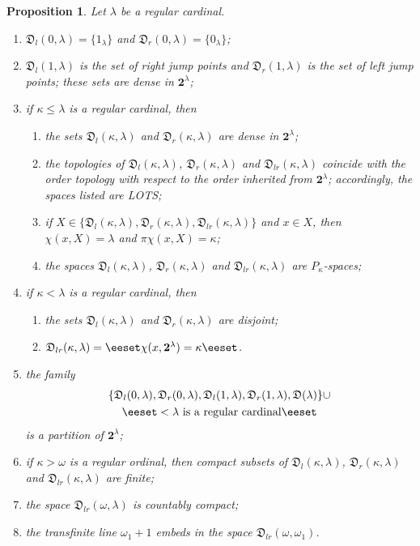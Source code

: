 \documentclass[preprint]{elsarticle}
\def\om{\omega}
\def\la{\lambda}
\def\ka{\kappa}
\def\sset#1{\{#1\}}
\def\set#1{\bbset#1\eeset}
\def\bbset#1:#2\eeset{\{#1\,:\,#2\}}
\newtheorem{proposition}{Proposition}[section]
\theoremstyle{definition}
\theoremstyle{remark}
\def\lex#1#2{\mathfrak{L}(#2^{#1})}
\def\lex#1#2{#2^{#1}}
\def\homg#1,#2#3{\mathfrak{D}_{#1}(#2,#3)}
\def\homm#1{{\mathfrak{D}(#1)}}
\def\B{2}
\def\B{\mathsf{2}}
\def\B{\mathbf{2}}
\def\lexab{\lex\la\B}
\begin{document}
\begin{proposition}\label{p:blex:1+1}
Let $\la$ be a regular cardinal.
\begin{enumerate}
\item
$\homg l,0\la=\sset{1_\la}$ and $\homg r,0\la=\sset{0_\la}$;
\item
$\homg l,1\la$ is the set of right jump points and $\homg r,1\la$ is the set of left jump points; these sets are dense in $\lexab$;
\item
if $\ka\leq \la$ is a regular cardinal, then 
\begin{enumerate}
\item
the sets $\homg l,\ka\la$ and $\homg r,\ka\la$ are dense in $\lexab$;
\item
the topologies of $\homg l,\ka\la$, $\homg r,\ka\la$ and $\homg lr,\ka\la$ coincide with the order topology with respect to the order inherited from $\lexab$; accordingly, the spaces listed are LOTS;
\item
if $X\in\sset{\homg l,\ka\la,\homg r,\ka\la,\homg lr,\ka\la}$ and $x\in X$, then $\chi(x,X)=\la$ and $\pi\chi(x,X)=\ka$;
\item
the spaces $\homg l,\ka\la$, $\homg r,\ka\la$ and $\homg lr,\ka\la$ are $P_\ka$-spaces;
\end{enumerate}
\item
if $\ka< \la$ is a regular cardinal, then 
\begin{enumerate}
\item
the sets $\homg l,\ka\la$ and $\homg r,\ka\la$ are disjoint;
\item
$\homg lr,\ka\la=\set{x\in\lexab: \pi\chi(x,\lexab)=\ka}$.
\end{enumerate}
\item
the family
\begin{gather*}
\{ \homg l,0\la, \homg r,0\la, \homg l,1\la, \homg r,1\la, \homm\la \} \cup 
\\
\set{\homg l,\ka\la, \homg r,\ka\la: \ka<\la\text{ is a regular cardinal}}
\end{gather*}
is a partition of $\lexab$;
\item
if $\ka>\om$ is a regular ordinal, then compact subsets of $\homg l,\ka\la$, $\homg r,\ka\la$ and $\homg lr,\ka\la$ are finite;
\item
the space $\homg lr,\om\la$ is countably compact;
\item
the transfinite line $\om_1+1$ embeds in the space $\homg lr,\om{\om_1}$.
\end{enumerate}
\end{proposition}
\end{document}
